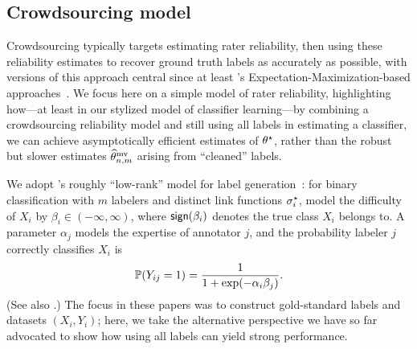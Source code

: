\subsection{Crowdsourcing model}
\label{sec:crowdsourcing}


Crowdsourcing typically targets estimating rater reliability, then using
these reliability estimates to recover ground truth labels as accurately as
possible, with versions of this approach central since at least
\citeauthor{DawidSk79}'s Expectation-Maximization-based
approaches~\cite{DawidSk79, WhitehillWuBeMoRu09, RaykarYuZhVaFlBoMo10}.  We
focus here on a simple model of rater reliability,
highlighting how---at least in our stylized model of classifier
learning---by combining a crowdsourcing reliability model and still using
all labels in estimating a classifier, we can achieve asymptotically
efficient estimates of $\theta^\star$, rather than the robust but slower
estimates $\widehat{\theta}_{n,m}^{\textup{mv}}$ arising from ``cleaned'' labels.


We adopt \citeauthor{WhitehillWuBeMoRu09}'s roughly ``low-rank'' model for
label generation~\citep{WhitehillWuBeMoRu09}: for binary classification with
$m$ labelers and distinct link functions $\sigma_i^\star$, model the
difficulty of $X_i$ by $\beta_i \in (-\infty, \infty)$, where
$\mathsf{sign}(\beta_i)$ denotes the true class $X_i$ belongs to.  A parameter
$\alpha_j$ models the expertise of annotator $j$, and the probability
labeler $j$ correctly classifies $X_i$ is
\begin{align*}
	\mathbb{P}(Y_{ij} = 1) = \frac{1}{1 +\exp(-\alpha_i \beta_j)}.
\end{align*}
(See also \citet{RaykarYuZhVaFlBoMo10}.) 
The focus in these papers was to construct gold-standard labels
and datasets $(X_i, Y_i)$; here, we take the alternative perspective
we have so far advocated to show how using all labels can yield strong
performance.

